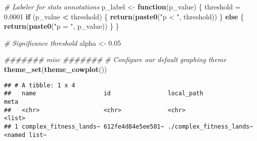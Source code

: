 \documentclass[]{book}
\newenvironment{Shaded}{\begin{snugshade}}{\end{snugshade}}
\newcommand{\CommentTok}[1]{\textcolor[rgb]{0.56,0.35,0.01}{\textit{#1}}}
\newcommand{\ControlFlowTok}[1]{\textcolor[rgb]{0.13,0.29,0.53}{\textbf{#1}}}
\newcommand{\DataTypeTok}[1]{\textcolor[rgb]{0.13,0.29,0.53}{#1}}
\newcommand{\FloatTok}[1]{\textcolor[rgb]{0.00,0.00,0.81}{#1}}
\newcommand{\KeywordTok}[1]{\textcolor[rgb]{0.13,0.29,0.53}{\textbf{#1}}}
\newcommand{\NormalTok}[1]{#1}
\newcommand{\OperatorTok}[1]{\textcolor[rgb]{0.81,0.36,0.00}{\textbf{#1}}}
\newcommand{\StringTok}[1]{\textcolor[rgb]{0.31,0.60,0.02}{#1}}
\begin{document}
\begin{Shaded}
\begin{Highlighting}[]
\CommentTok{# Labeler for stats annotations}
\NormalTok{p_label <-}\StringTok{ }\ControlFlowTok{function}\NormalTok{(p_value) \{}
\NormalTok{  threshold =}\StringTok{ }\FloatTok{0.0001}
  \ControlFlowTok{if}\NormalTok{ (p_value }\OperatorTok{<}\StringTok{ }\NormalTok{threshold) \{}
    \KeywordTok{return}\NormalTok{(}\KeywordTok{paste0}\NormalTok{(}\StringTok{"p < "}\NormalTok{, threshold))}
\NormalTok{  \} }\ControlFlowTok{else}\NormalTok{ \{}
    \KeywordTok{return}\NormalTok{(}\KeywordTok{paste0}\NormalTok{(}\StringTok{"p = "}\NormalTok{, p_value))}
\NormalTok{  \}}
\NormalTok{\}}

\CommentTok{# Significance threshold}
\NormalTok{alpha <-}\StringTok{ }\FloatTok{0.05}

\CommentTok{####### misc #######}
\CommentTok{# Configure our default graphing theme}
\KeywordTok{theme_set}\NormalTok{(}\KeywordTok{theme_cowplot}\NormalTok{())}
\end{Highlighting}
\end{Shaded}

\begin{Shaded}
\end{Shaded}

\begin{verbatim}
## # A tibble: 1 x 4
##   name                   id                local_path               meta        
##   <chr>                  <chr>             <chr>                    <list>      
## 1 complex_fitness_lands~ 612fe4d84e5ee501~ ./complex_fitness_lands~ <named list~
\end{verbatim}
\end{document}
